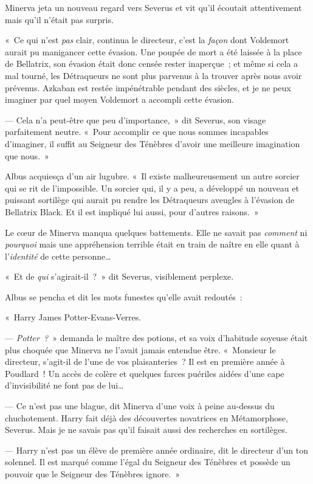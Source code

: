 Minerva jeta un nouveau regard vers Severus et vit qu'il écoutait attentivement mais qu'il n'était pas surpris.

«~Ce qui n'est \emph{pas} clair, continua le directeur, c'est la \emph{façon} dont Voldemort aurait pu manigancer cette évasion.
Une poupée de mort a été laissée à la place de Bellatrix, son évasion était donc censée rester inaperçue~; et même si cela a mal tourné, les Détraqueurs ne sont plus parvenus à la trouver après nous avoir prévenus.
Azkaban est restée impénétrable pendant des siècles, et je ne peux imaginer par quel moyen Voldemort a accompli cette évasion.

--- Cela n'a peut-être que peu d'importance,~» dit Severus, son visage parfaitement neutre.
«~Pour accomplir ce que nous sommes incapables d'imaginer, il suffit au Seigneur des Ténèbres d'avoir une meilleure imagination que nous.~»

Albus acquiesça d'un air lugubre.
«~Il existe malheureusement un autre sorcier qui se rit de l'impossible.
Un sorcier qui, il y a peu, a développé un nouveau et puissant sortilège qui aurait pu rendre les Détraqueurs aveugles à l'évasion de Bellatrix Black.
Et il est impliqué lui aussi, pour d'autres raisons.~»

Le cœur de Minerva manqua quelques battements.
Elle ne savait pas \emph{comment} ni \emph{pourquoi} mais une appréhension terrible était en train de naître en elle quant à l'\emph{identité} de cette personne…

«~Et de \emph{qui} s'agirait-il~?~»
dit Severus, visiblement perplexe.

Albus se pencha et dit les mots funestes qu'elle avait redoutés~:

«~Harry James Potter-Evans-Verres.

--- \emph{Potter~?}~» demanda le maître des potions, et sa voix d'habitude soyeuse était plus choquée que Minerva ne l'avait jamais entendue être.
«~Monsieur le directeur, s'agit-il de l'une de vos plaisanteries~?
Il est en première année à Poudlard~!
Un accès de colère et quelques farces puériles aidées d'une cape d'invisibilité ne font pas de lui…

--- Ce n'est pas une blague, dit Minerva d'une voix à peine au-dessus du chuchotement.
Harry fait déjà des découvertes novatrices en Métamorphose, Severus.
Mais je ne savais pas qu'il faisait aussi des recherches en sortilèges.

--- Harry n'est pas un élève de première année ordinaire, dit le directeur d'un ton solennel.
Il est marqué comme l'égal du Seigneur des Ténèbres et possède un pouvoir que le Seigneur des Ténèbres ignore.~»

